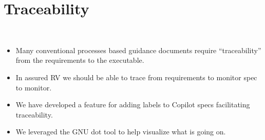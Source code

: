 \section{Traceability}~\label{sec:trace}

\noindent{}

\begin{itemize}
\item Many conventional processes based  guidance
  documents require ``traceability'' from the requirements to the
  executable. 
\item In assured RV we should be able to trace from requirements to
  monitor spec to monitor. 
\item We have developed a feature for adding labels to Copilot specs
  facilitating traceability.  
\item  We leveraged the GNU dot tool to help visualize what is going
  on. 

\end{itemize}
